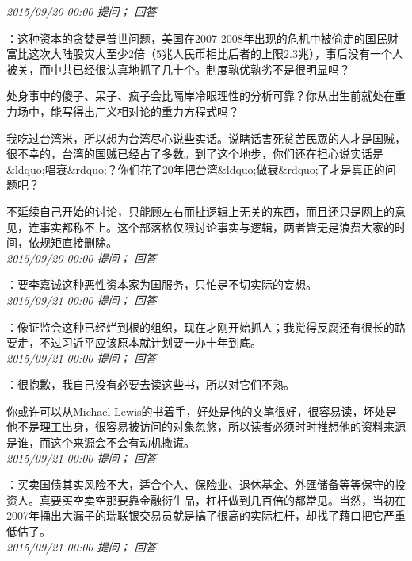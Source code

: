\documentclass[twocolumn]{ctexart}
\begin{document}
\textit{\hfill\noindent\small 2015/09/20 00:00 提问； 回答}

：这种资本的贪婪是普世问题，美国在2007-2008年出现的危机中被偷走的国民财富比这次大陆股灾大至少2倍（5兆人民币相比后者的上限2.3兆），事后没有一个人被关，而中共已经很认真地抓了几十个。制度孰优孰劣不是很明显吗？

处身事中的傻子、呆子、疯子会比隔岸冷眼理性的分析可靠？你从出生前就处在重力场中，能写得出广义相对论的重力方程式吗？

我吃过台湾米，所以想为台湾尽心说些实话。说瞎话害死贫苦民眾的人才是国贼，很不幸的，台湾的国贼已经占了多数。到了这个地步，你们还在担心说实话是\&ldquo;唱衰\&rdquo;？你们花了20年把台湾\&ldquo;做衰\&rdquo;了才是真正的问题吧？

不延续自己开始的讨论，只能顾左右而扯逻辑上无关的东西，而且还只是网上的意见，连事实都称不上。这个部落格仅限讨论事实与逻辑，两者皆无是浪费大家的时间，依规矩直接删除。\\

\textit{\hfill\noindent\small 2015/09/20 00:00 提问； 回答}

：要李嘉诚这种恶性资本家为国服务，只怕是不切实际的妄想。\\

\textit{\hfill\noindent\small 2015/09/21 00:00 提问； 回答}

：像证监会这种已经烂到根的组织，现在才刚开始抓人；我觉得反腐还有很长的路要走，不过习近平应该原本就计划要一办十年到底。\\

\textit{\hfill\noindent\small 2015/09/21 00:00 提问； 回答}

：很抱歉，我自己没有必要去读这些书，所以对它们不熟。

你或许可以从Michael Lewis的书着手，好处是他的文笔很好，很容易读，坏处是他不是理工出身，很容易被访问的对象忽悠，所以读者必须时时推想他的资料来源是谁，而这个来源会不会有动机撒谎。\\

\textit{\hfill\noindent\small 2015/09/21 00:00 提问； 回答}

：买卖国债其实风险不大，适合个人、保险业、退休基金、外匯储备等等保守的投资人。真要买空卖空那要靠金融衍生品，杠杆做到几百倍的都常见。当然，当初在2007年捅出大漏子的瑞联银交易员就是搞了很高的实际杠杆，却找了藉口把它严重低估了。\\

\textit{\hfill\noindent\small 2015/09/21 00:00 提问； 回答}
\end{document}
